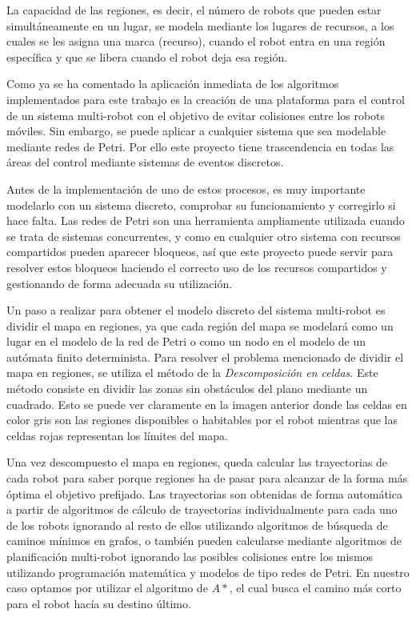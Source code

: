 La capacidad de las regiones, es decir, el número de robots que pueden estar simultáneamente en un lugar, se modela mediante los lugares de recursos, a los cuales se les asigna una marca (recurso), cuando el robot entra en una región específica y que se libera cuando el robot deja esa región.

Como ya se ha comentado la aplicación inmediata de los algoritmos implementados para este trabajo es la creación de una plataforma para el control de un sistema multi-robot con el objetivo de evitar colisiones entre los robots móviles. Sin embargo, se puede aplicar a cualquier sistema que sea modelable mediante redes de Petri. Por ello este proyecto tiene trascendencia en todas las áreas del control mediante sistemas de eventos discretos.

Antes de la implementación de uno de estos procesos, es muy importante modelarlo con un sistema discreto, comprobar su funcionamiento y corregirlo si hace falta. Las redes de Petri son una herramienta ampliamente utilizada cuando se trata de sistemas concurrentes, y como en cualquier otro sistema con recursos compartidos pueden aparecer bloqueos, así que este proyecto puede servir para resolver estos bloqueos haciendo el correcto uso de los recursos compartidos y gestionando de forma adecuada su utilización.

Un paso a realizar para obtener el modelo discreto del sistema multi-robot es dividir el mapa en regiones, ya que cada región del mapa se modelará como un lugar en el modelo de la red de Petri o como un nodo en el modelo de un autómata finito determinista. Para resolver el problema mencionado de dividir el mapa en regiones, se utiliza el método de la \textit{Descomposición en celdas}. Este método consiste en dividir las zonas sin obstáculos del plano mediante un cuadrado. Esto se puede ver claramente en la imagen anterior donde las celdas en color gris son las regiones disponibles o habitables por el robot mientras que las celdas rojas representan los límites del mapa.

Una vez descompuesto el mapa en regiones, queda calcular las trayectorias de cada robot para saber porque regiones ha de pasar para alcanzar de la forma más óptima el objetivo prefijado. Las trayectorias son obtenidas de forma automática a partir de algoritmos de cálculo de trayectorias individualmente para cada uno de los robots ignorando al resto de ellos utilizando algoritmos de búsqueda de caminos mínimos en grafos, o también pueden calcularse mediante algoritmos de planificación multi-robot ignorando las posibles colisiones entre los mismos utilizando programación matemática y modelos de tipo redes de Petri. En nuestro caso optamos por utilizar el algoritmo de $A*$, el cual busca el camino más corto para el robot hacía su destino último.

